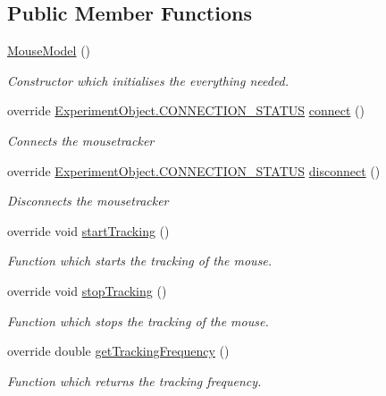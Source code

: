 \subsection*{Public Member Functions}
\begin{DoxyCompactItemize}
\item 
\hyperlink{class_web_analyzer_1_1_test_1_1_communication_1_1_mouse_model_ad84f4a65000f2e03f7003546d5e63dd2}{Mouse\+Model} ()
\begin{DoxyCompactList}\small\item\em Constructor which initialises the everything needed. \end{DoxyCompactList}\item 
override \hyperlink{class_web_analyzer_1_1_u_i_1_1_interaction_objects_1_1_experiment_object_a2875208b4f4b0ed643593152f4ec025c}{Experiment\+Object.\+C\+O\+N\+N\+E\+C\+T\+I\+O\+N\+\_\+\+S\+T\+A\+T\+U\+S} \hyperlink{class_web_analyzer_1_1_test_1_1_communication_1_1_mouse_model_a147d911ce601efe3bf779cebaed106e9}{connect} ()
\begin{DoxyCompactList}\small\item\em Connects the mousetracker \end{DoxyCompactList}\item 
override \hyperlink{class_web_analyzer_1_1_u_i_1_1_interaction_objects_1_1_experiment_object_a2875208b4f4b0ed643593152f4ec025c}{Experiment\+Object.\+C\+O\+N\+N\+E\+C\+T\+I\+O\+N\+\_\+\+S\+T\+A\+T\+U\+S} \hyperlink{class_web_analyzer_1_1_test_1_1_communication_1_1_mouse_model_a7928a4615bb62b6e4b273340bd224554}{disconnect} ()
\begin{DoxyCompactList}\small\item\em Disconnects the mousetracker \end{DoxyCompactList}\item 
override void \hyperlink{class_web_analyzer_1_1_test_1_1_communication_1_1_mouse_model_ad2d20d7f2f302ef22e40da86a18dcaf9}{start\+Tracking} ()
\begin{DoxyCompactList}\small\item\em Function which starts the tracking of the mouse. \end{DoxyCompactList}\item 
override void \hyperlink{class_web_analyzer_1_1_test_1_1_communication_1_1_mouse_model_a025e9d3e6918ebe7b6a1fd1ccf019b8a}{stop\+Tracking} ()
\begin{DoxyCompactList}\small\item\em Function which stops the tracking of the mouse. \end{DoxyCompactList}\item 
override double \hyperlink{class_web_analyzer_1_1_test_1_1_communication_1_1_mouse_model_aa46691d72c894f0ba51943e37c8ce0a0}{get\+Tracking\+Frequency} ()
\begin{DoxyCompactList}\small\item\em Function which returns the tracking frequency. \end{DoxyCompactList}\end{DoxyCompactItemize}

